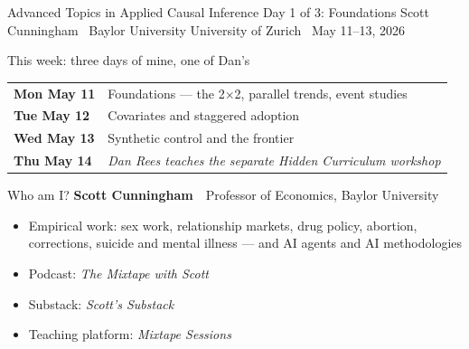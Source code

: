 \documentclass[aspectratio=169,11pt]{beamer}
\begin{document}

\remixtitleframe
  {Advanced Topics in Applied Causal Inference}
  {Day 1 of 3: Foundations}
  {Scott Cunningham \textperiodcentered\ Baylor University}
  {University of Zurich \textperiodcentered\ May 11--13, 2026}

\begin{frame}{This week: three days of mine, one of Dan's}
\vspace{0.3em}
\begin{center}
\renewcommand{\arraystretch}{1.5}
\begin{tabular}{@{}p{}p{}@{}}
\textbf{\color{accent}Mon May 11} & Foundations --- the 2{$\times$}2, parallel trends, event studies \\
\textbf{\color{accent}Tue May 12} & Covariates and staggered adoption \\
\textbf{\color{accent}Wed May 13} & Synthetic control and the frontier \\
\textbf{\color{warmgray}Thu May 14} & \textit{Dan Rees teaches the separate Hidden Curriculum workshop} \\
\end{tabular}
\end{center}
\end{frame}

\begin{frame}{Who am I?}
\vspace{0.5em}
\textbf{Scott Cunningham} \,\textperiodcentered\, Professor of Economics, Baylor University
\vspace{0.8em}
\begin{itemize}
  \item Empirical work: sex work, relationship markets, drug policy, abortion, corrections, suicide and mental illness --- and AI agents and AI methodologies
  \item Podcast: \textit{The Mixtape with Scott}
  \item Substack: \textit{Scott's Substack}
  \item Teaching platform: \textit{Mixtape Sessions}
\end{itemize}
\end{frame}
\end{document}

